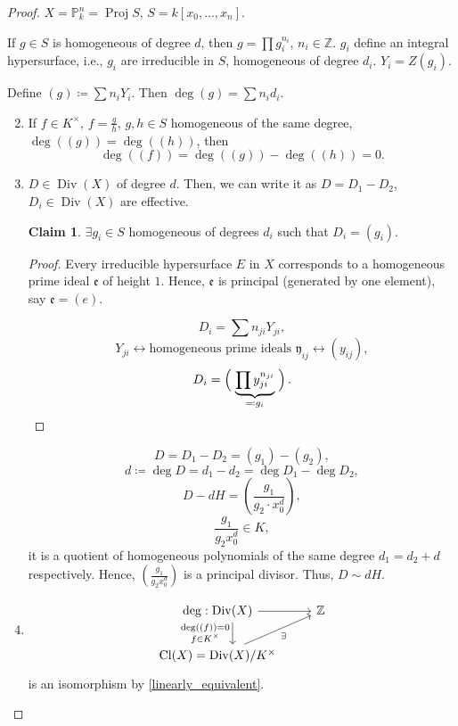 \documentclass[12pt]{article}
\DeclareMathOperator{\Proj}{Proj}
\DeclareMathOperator{\Div}{Div}
\DeclareMathOperator{\Cl}{Cl}
\theoremstyle{definition}
\newtheorem*{claim}{Claim}
\begin{document}
\begin{proof}
$X=\mathbb P_k^n=\Proj S$, $S=k[x_0,\ldots,x_n]$.

If $g\in S$ is homogeneous of degree $d$, then $g=\prod g_i^{n_i}$, $n_i\in\mathbb Z$. $g_i$ define an integral hypersurface, i.e., $g_i$ are irreducible in $S$, homogeneous of degree $d_i$. $Y_i=Z(g_i)$. 

Define $(g)\coloneqq\sum n_iY_i$. Then $\deg(g)=\sum n_id_i$.

\begin{enumerate}[label=\arabic*)]
\setcounter{enumi}{1}
\item If $f\in K^\times$, $f=\frac gh$, $g,h\in S$ homogeneous of the same degree, $\deg((g))=\deg((h))$, then
\[\deg((f))=\deg((g))-\deg((h))=0.\]

\setcounter{enumi}{0}
\item $D\in\Div(X)$ of degree $d$. Then, we can write it as $D=D_1-D_2$, $D_i\in\Div(X)$ are effective.

\begin{claim}
$\exists g_i\in S$ homogeneous of degrees $d_i$ such that $D_i=(g_i)$.
\end{claim}

\begin{proof}
Every irreducible hypersurface $E$ in $X$ corresponds to a homogeneous prime ideal $\mathfrak e$ of height $1$. Hence, $\mathfrak e$ is principal (generated by one element), say $\mathfrak e=(e)$.

\[D_i=\sum n_{ji}Y_{ji},\]
\[Y_{ji}\longleftrightarrow\text{homogeneous prime ideals }\mathfrak y_{ij}\longleftrightarrow(y_{ij}),\]
\[D_i=\left(\vphantom{\prod y_{ji}^{n_{ji}}}\right.\underbrace{\prod y_{ji}^{n_{ji}}}_{\eqqcolon g_i}\left.\vphantom{\prod y_{ji}^{n_{ji}}}\right).\]
\end{proof}

\[D=D_1-D_2=(g_1)-(g_2),\]
\[d\coloneqq\deg D=d_1-d_2=\deg D_1-\deg D_2,\]
\[D-dH=\left(\frac{g_1}{g_2\cdot x_0^d}\right),\]
\[\frac{g_1}{g_2x_0^d}\in K,\]
it is a quotient of homogeneous polynomials of the same degree $d_1=d_2+d$ respectively. Hence, $(\frac{g_1}{g_2x_0^d})$ is a principal divisor. Thus, $D\sim dH$.

\setcounter{enumi}{2}
\item
\[\begin{tikzcd}\deg:\Div(X)\arrow[r]\arrow[d,shift left=5,"\substack{\deg((f))=0\\f\in K^\times}",swap]&\mathbb Z\\\Cl(X)=\Div(X)/K^\times\arrow[ru,"\exists",swap]\end{tikzcd}\]
is an isomorphism by \ref{linearly_equivalent}.
\end{enumerate}
\end{proof}
\end{document}
